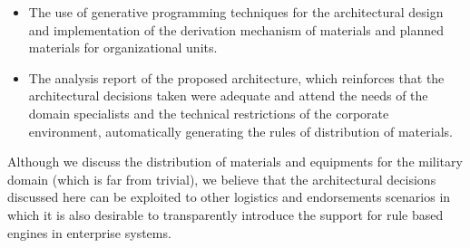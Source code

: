 \begin{itemize}
\item The use of generative programming techniques for the architectural design and implementation of the derivation mechanism of materials and planned materials for organizational units.

\item The analysis report of the proposed architecture, which reinforces that the architectural decisions taken were adequate and attend the needs of the domain specialists and the technical restrictions of the corporate environment, automatically generating the rules of distribution of materials.
\end{itemize} 


Although we discuss the distribution of materials and equipments for the military domain (which is far from trivial), we believe that the architectural decisions discussed here can be exploited to other logistics and endorsements scenarios in which it is also desirable to transparently introduce the support for rule based engines in enterprise systems.


